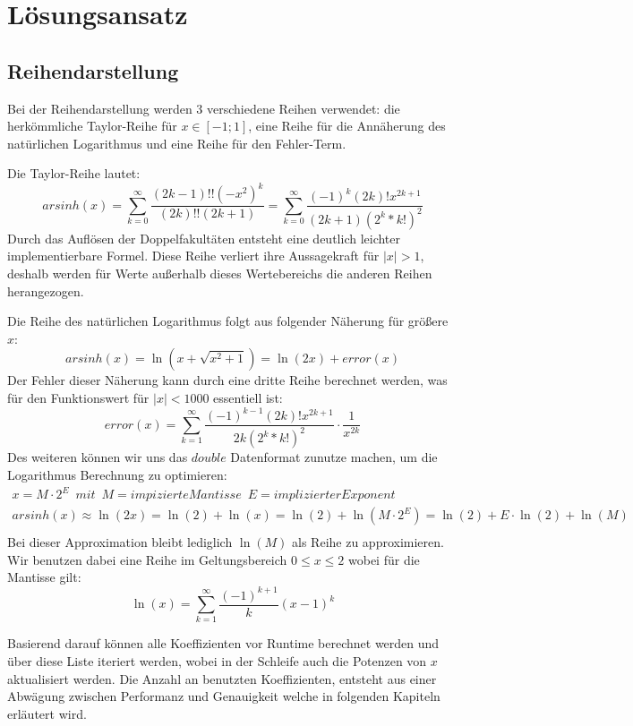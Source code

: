 \documentclass[course=erap] {aspdoc}
\begin{document}
    \section{Lösungsansatz}

    \subsection{Reihendarstellung}
    Bei der Reihendarstellung werden 3 verschiedene Reihen verwendet: die herkömmliche Taylor-Reihe für $x\in[-1;1]$,
    eine Reihe für die Annäherung des natürlichen Logarithmus und eine Reihe für den Fehler-Term.

    Die Taylor-Reihe lautet:
    \[
        arsinh(x) = \sum_{k = 0}^{\infty} \frac{(2k-1)!!(-x^2)^k}{(2k)!!(2k + 1)}
        = \sum_{k = 0}^{\infty} \frac{(-1)^k(2k)!x^{2k + 1}}{(2k + 1)(2^k*k!)^2}

    \]
    Durch das Auflösen der Doppelfakultäten entsteht eine deutlich leichter implementierbare Formel.
    Diese Reihe verliert ihre Aussagekraft für $|x| > 1$, deshalb werden für Werte außerhalb dieses Wertebereichs die anderen Reihen herangezogen.


    Die Reihe des natürlichen Logarithmus folgt aus folgender Näherung für größere $x$:
    \[
        arsinh(x) = \ln(x + \sqrt{x^2 + 1}) = \ln(2x) + error(x)
    \]
    Der Fehler dieser Näherung kann durch eine dritte Reihe berechnet werden, was für den Funktionswert für $|x| < 1000$ essentiell ist:
    \[
        error(x) =  \sum_{k = 1}^{\infty} \frac{(-1)^{k - 1}(2k)!x^{2k + 1}}{2k(2^k*k!)^2} \cdot \frac{1}{x^{2k}}
    \]
    Des weiteren können wir uns das $double$ Datenformat zunutze machen, um die Logarithmus Berechnung zu optimieren:
    \begin{gather*}
        x = M\cdot2^E \,\,\, mit \,\,\, M = impizierte Mantisse \,\,\, E = implizierter Exponent\\
        arsinh(x) \approx \ln(2x) = \ln(2) + \ln(x) = \ln(2) + \ln(M\cdot2^E) = \ln(2) + E\cdot\ln(2) + \ln(M)\\
    \end{gather*}
    Bei dieser Approximation bleibt lediglich $\ln(M)$ als Reihe zu approximieren.
    Wir benutzen dabei eine Reihe im Geltungsbereich $0 \leq x \leq 2$ wobei für die Mantisse gilt:
    \[
        \ln(x) = \sum_{k = 1}^{\infty} \frac{(-1)^{k + 1}}{k}(x - 1)^k
    \]

    Basierend darauf können alle Koeffizienten vor Runtime berechnet werden und über diese Liste iteriert werden, wobei in der Schleife auch die Potenzen von $x$ aktualisiert werden.
    Die Anzahl an benutzten Koeffizienten, entsteht aus einer Abwägung zwischen Performanz und Genauigkeit welche in folgenden Kapiteln erläutert wird.
\end{document}
